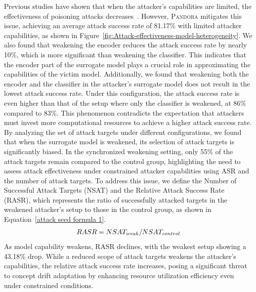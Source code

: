 \documentclass[lettersize,journal]{IEEEtran}
\newcommand{\pandora}{{\scshape Pandora}\xspace}
\begin{document}
Previous studies have shown that when the attacker’s capabilities are limited, the effectiveness of poisoning attacks decreases~\cite{2022-ACM-Computing-Survey-Threats-to-training}.
However, \pandora mitigates this issue, achieving an average attack success rate of 81.17\% with limited attacker capabilities, as shown in Figure~\ref{fig:Attack-effectiveness-model-heterogeneity}. 
We also found that weakening the encoder reduces the attack success rate by nearly 10\%, which is more significant than weakening the classifier.  
This indicates that the encoder part of the surrogate model plays a crucial role in approximating the capabilities of the victim model.
Additionally, we found that weakening both the encoder and the classifier in the attacker’s surrogate model does not result in the lowest attack success rate.
Under this configuration, the attack success rate is even higher than that of the setup where only the classifier is weakened, at 86\% compared to 83\%.
This phenomenon contradicts the expectation that attackers must invest more computational resources to achieve a higher attack success rate.
By analyzing the set of attack targets under different configurations, we found that when the surrogate model is weakened, its selection of attack targets is significantly biased.
In the synchronized weakening setting, only 55\% of the attack targets remain compared to the control group, highlighting the need to assess attack effectiveness under constrained attacker capabilities using ASR and the number of attack targets.
To address this issue, we define the Number of Successful Attack Targets (NSAT) and the Relative Attack Success Rate (RASR), which represents the ratio of successfully attacked targets in the weakened attacker’s setup to those in the control group, as shown in Equation~\ref{attack seed formula 1}.
\begin{equation}
	\begin{aligned}
		RASR = \small NSAT_{weak}/\small NSAT_{control}
	\end{aligned}
	\label{attack seed formula 1}
\end{equation}
As model capability weakens, RASR declines, with the weakest setup showing a 43.18\% drop.
While a reduced scope of attack targets weakens the attacker’s capabilities, the relative attack success rate increases, posing a significant threat to concept drift adaptation by enhancing resource utilization efficiency even under constrained conditions.
\end{document}
